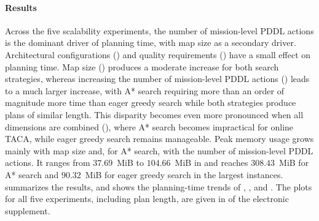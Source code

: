 \paragraph{Results}

Across the five scalability experiments, the number of mission-level PDDL actions is the dominant driver of planning time, with map size as a secondary driver. Architectural configurations (\Stwo) and quality requirements (\Sthree) have a small effect on planning time. Map size (\Sone) produces a moderate increase for both search strategies, whereas increasing the number of mission-level PDDL actions (\Sfour) leads to a much larger increase, with A* search requiring more than an order of magnitude more time than eager greedy search while both strategies produce plans of similar length. This disparity becomes even more pronounced when all dimensions are combined (\Sfive), where A* search becomes impractical for online TACA, while eager greedy search remains manageable. Peak memory usage grows mainly with map size and, for A* search, with the number of mission-level PDDL actions. It ranges from $37.69$~MiB to $104.66$~MiB in \Sone and reaches $308.43$~MiB for A* search and $90.32$~MiB for eager greedy search in the largest \Sfive instances.  summarizes the results, and  shows the planning-time trends of \Sone, \Sfour, and \Sfive. The plots for all five experiments, including plan length, are given in  of the electronic supplement.



